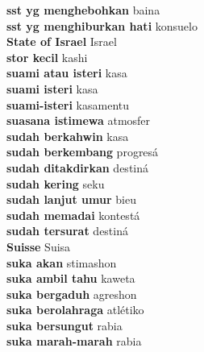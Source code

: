 \textbf{ sst yg menghebohkan  } baina \\
\textbf{ sst yg menghiburkan hati  } konsuelo \\
\textbf{ State of Israel  } Israel \\
\textbf{ stor kecil  } kashi \\
\textbf{ suami atau isteri  } kasa \\
\textbf{ suami isteri  } kasa \\
\textbf{ suami-isteri  } kasamentu \\
\textbf{ suasana istimewa  } atmosfer \\
\textbf{ sudah berkahwin  } kasa \\
\textbf{ sudah berkembang  } progresá \\
\textbf{ sudah ditakdirkan  } destiná \\
\textbf{ sudah kering  } seku \\
\textbf{ sudah lanjut umur  } bieu \\
\textbf{ sudah memadai  } kontestá \\
\textbf{ sudah tersurat  } destiná \\
\textbf{ Suisse  } Suisa \\
\textbf{ suka akan  } stimashon \\
\textbf{ suka ambil tahu  } kaweta \\
\textbf{ suka bergaduh  } agreshon \\
\textbf{ suka berolahraga  } atlétiko \\
\textbf{ suka bersungut  } rabia \\
\textbf{ suka marah-marah  } rabia \\
